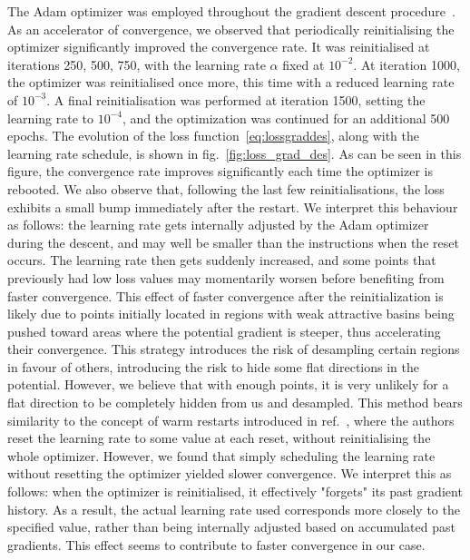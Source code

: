 \documentclass[11pt,a4paper]{article}
\begin{document}
	The Adam optimizer was employed throughout the gradient descent procedure~\cite{kingma2017adammethodstochasticoptimization}. As an accelerator of convergence, we observed that periodically reinitialising the optimizer significantly improved the convergence rate. It was reinitialised at iterations {250, 500, 750}, with the learning rate $\alpha$ fixed at $10^{-2}$. At iteration 1000, the optimizer was reinitialised once more, this time with a reduced learning rate of $10^{-3}$. A final reinitialisation was performed at iteration 1500, setting the learning rate to $10^{-4}$, and the optimization was continued for an additional 500 epochs. The evolution of the loss function~\eqref{eq:lossgraddes}, along with the learning rate schedule, is shown in fig.~\ref{fig:loss_grad_des}. As can be seen in this figure, the convergence rate improves significantly each time the optimizer is rebooted. We also observe that, following the last few reinitialisations, the loss exhibits a small bump immediately after the restart. We interpret this behaviour as follows: the learning rate gets internally adjusted by the Adam optimizer during the descent, and may well be smaller than the instructions when the reset occurs. The learning rate then gets suddenly increased, and some points that previously had low loss values may momentarily worsen before benefiting from faster convergence. This effect of faster convergence after the reinitialization is likely due to points initially located in regions with weak attractive basins being pushed toward areas where the potential gradient is steeper, thus accelerating their convergence. This strategy introduces the risk of desampling certain regions in favour of others, introducing the risk to hide some flat directions in the potential. However, we believe that with enough points, it is very unlikely for a flat direction to be completely hidden from us and desampled. This method bears similarity to the concept of warm restarts introduced in ref.~\cite{loshchilov2017sgdrstochasticgradientdescent}, where the authors reset the learning rate to some value at each reset, without reinitialising the whole optimizer. However, we found that simply scheduling the learning rate without resetting the optimizer yielded slower convergence. We interpret this as follows: when the optimizer is reinitialised, it effectively "forgets" its past gradient history. As a result, the actual learning rate used corresponds more closely to the specified value, rather than being internally adjusted based on accumulated past gradients. This effect seems to contribute to faster convergence in our case.
	
\end{document}
